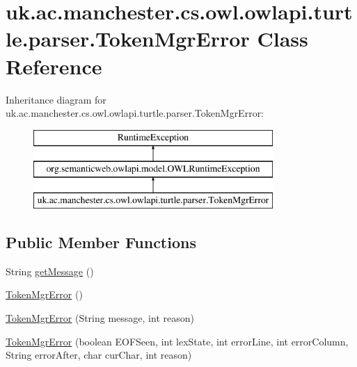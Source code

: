 \hypertarget{classuk_1_1ac_1_1manchester_1_1cs_1_1owl_1_1owlapi_1_1turtle_1_1parser_1_1_token_mgr_error}{\section{uk.\-ac.\-manchester.\-cs.\-owl.\-owlapi.\-turtle.\-parser.\-Token\-Mgr\-Error Class Reference}
\label{classuk_1_1ac_1_1manchester_1_1cs_1_1owl_1_1owlapi_1_1turtle_1_1parser_1_1_token_mgr_error}
}
Inheritance diagram for uk.\-ac.\-manchester.\-cs.\-owl.\-owlapi.\-turtle.\-parser.\-Token\-Mgr\-Error\-:\begin{figure}[H]
\begin{center}
\leavevmode
\includegraphics[height=3.000000cm]{classuk_1_1ac_1_1manchester_1_1cs_1_1owl_1_1owlapi_1_1turtle_1_1parser_1_1_token_mgr_error}
\end{center}
\end{figure}
\subsection*{Public Member Functions}
\begin{DoxyCompactItemize}
\item 
String \hyperlink{classuk_1_1ac_1_1manchester_1_1cs_1_1owl_1_1owlapi_1_1turtle_1_1parser_1_1_token_mgr_error_a0036d600d68ea80ae0abe6326e74c0c8}{get\-Message} ()
\item 
\hyperlink{classuk_1_1ac_1_1manchester_1_1cs_1_1owl_1_1owlapi_1_1turtle_1_1parser_1_1_token_mgr_error_ae44edced74d3aad67ce8d402231d7b18}{Token\-Mgr\-Error} ()
\item 
\hyperlink{classuk_1_1ac_1_1manchester_1_1cs_1_1owl_1_1owlapi_1_1turtle_1_1parser_1_1_token_mgr_error_a570c4e5e33537afed0ca7b87c54b9c65}{Token\-Mgr\-Error} (String message, int reason)
\item 
\hyperlink{classuk_1_1ac_1_1manchester_1_1cs_1_1owl_1_1owlapi_1_1turtle_1_1parser_1_1_token_mgr_error_a97e4e02e08e5a1667434b4db9401f717}{Token\-Mgr\-Error} (boolean E\-O\-F\-Seen, int lex\-State, int error\-Line, int error\-Column, String error\-After, char cur\-Char, int reason)
\end{DoxyCompactItemize}
